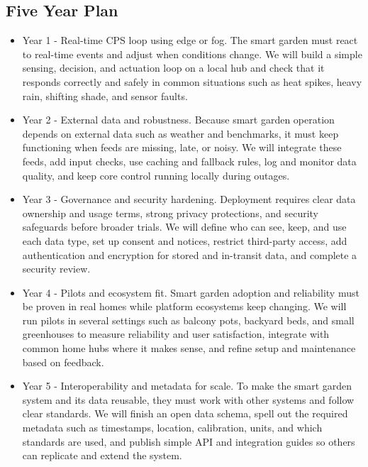 \documentclass{sigchi}
\begin{document}
\subsection{Five Year Plan}

\begin{itemize}

\item Year 1 - Real-time CPS loop using edge or fog. The smart garden must react to real-time events and adjust when conditions change. We will build a simple sensing, decision, and actuation loop on a local hub and check that it responds correctly and safely in common situations such as heat spikes, heavy rain, shifting shade, and sensor faults.

\item Year 2 - External data and robustness. Because smart garden operation depends on external data such as weather and benchmarks, it must keep functioning when feeds are missing, late, or noisy. We will integrate these feeds, add input checks, use caching and fallback rules, log and monitor data quality, and keep core control running locally during outages.

\item Year 3 - Governance and security hardening. Deployment requires clear data ownership and usage terms, strong privacy protections, and security safeguards before broader trials. We will define who can see, keep, and use each data type, set up consent and notices, restrict third-party access, add authentication and encryption for stored and in-transit data, and complete a security review.

\item Year 4 - Pilots and ecosystem fit. Smart garden adoption and reliability must be proven in real homes while platform ecosystems keep changing. We will run pilots in several settings such as balcony pots, backyard beds, and small greenhouses to measure reliability and user satisfaction, integrate with common home hubs where it makes sense, and refine setup and maintenance based on feedback.

\item Year 5 - Interoperability and metadata for scale. To make the smart garden system and its data reusable, they must work with other systems and follow clear standards. We will finish an open data schema, spell out the required metadata such as timestamps, location, calibration, units, and which standards are used, and publish simple API and integration guides so others can replicate and extend the system.

\end{itemize}
\end{document}
